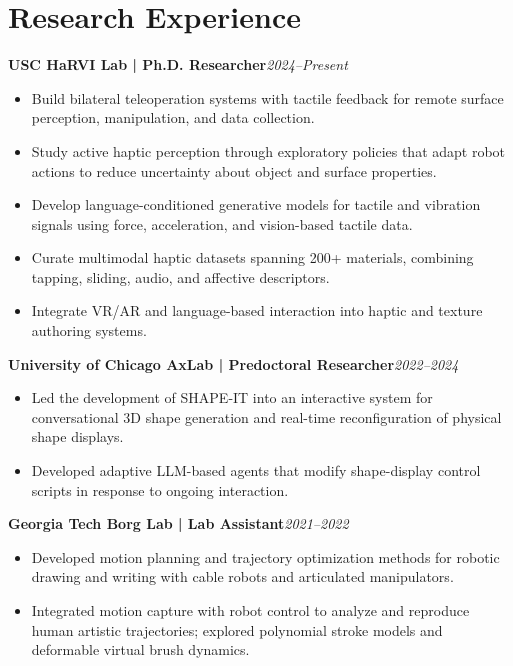 \documentclass[11pt,letterpaper]{article}
\newcommand{\role}[2]{\textbf{#1}\hfill\textit{#2}\par}
\begin{document}
\section*{Research Experience}
\role{USC HaRVI Lab | Ph.D. Researcher}{2024--Present}
\begin{itemize}
\item Build bilateral teleoperation systems with tactile feedback for remote surface perception, manipulation, and data collection.
\item Study active haptic perception through exploratory policies that adapt robot actions to reduce uncertainty about object and surface properties.
\item Develop language-conditioned generative models for tactile and vibration signals using force, acceleration, and vision-based tactile data.
\item Curate multimodal haptic datasets spanning 200+ materials, combining tapping, sliding, audio, and affective descriptors.
\item Integrate VR/AR and language-based interaction into haptic and texture authoring systems.
\end{itemize}
\vspace{3pt}
\role{University of Chicago AxLab | Predoctoral Researcher}{2022--2024}
\begin{itemize}
\item Led the development of SHAPE-IT into an interactive system for conversational 3D shape generation and real-time reconfiguration of physical shape displays.
\item Developed adaptive LLM-based agents that modify shape-display control scripts in response to ongoing interaction.
\end{itemize}
\vspace{3pt}
\role{Georgia Tech Borg Lab | Lab Assistant}{2021--2022}
\begin{itemize}
\item Developed motion planning and trajectory optimization methods for robotic drawing and writing with cable robots and articulated manipulators.
\item Integrated motion capture with robot control to analyze and reproduce human artistic trajectories; explored polynomial stroke models and deformable virtual brush dynamics.
\end{itemize}
\end{document}
